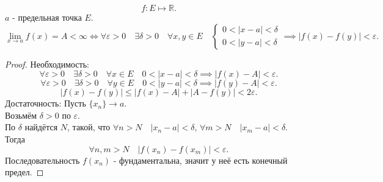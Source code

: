 \documentclass[11pt, oneside]{article}   	%
\begin{document}
    \begin{theorem}
        \[ f: E \mapsto \mathbb{R} .\] 
        $a$ - предельная точка $E$.\\
        \[ \lim\limits_{x \to a} f(x) = A < \infty \iff \forall{\varepsilon>0}\quad \exists{\delta>0}\quad \forall{x,y\in E}\quad  \begin{cases} 0<|x-a|<\delta\\ 0<|y-a|<\delta \end{cases} \implies |f(x)-f(y)| < \varepsilon  .\]
        \begin{proof}
            Необходимость:
            \[ \forall{\varepsilon>0}\quad \exists{\delta > 0}\quad \forall{x\in E}\quad 0<|x-a|<\delta \implies |f(x)-A| < \varepsilon   .\] 
            \[ \forall{\varepsilon>0}\quad \exists{\delta > 0}\quad \forall{y\in E}\quad 0<|y-a|<\delta \implies |f(y)-A| < \varepsilon   .\] 
            \[ |f(x)-f(y)| \le |f(x)-A|+|A-f(y)| < 2\varepsilon .\]
            Достаточность:
            Пусть $\{x_n\} \to a$.\\
            Возьмём $\delta>0$ по $\varepsilon$.\\
            По $\delta$ найдётся $N$, такой, что $\forall{n>N}\quad |x_n-a|<\delta $, $\forall{m>N}\quad |x_m-a|<\delta $.\\
            Тогда
            \[ \forall{n,m>N}\quad |f(x_n)-f(x_m)|<\varepsilon  .\]
            Последовательность $f(x_n)$ - фундаментальна, значит у неё есть конечный предел.
        \end{proof}
    \end{theorem}
\end{document}
